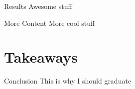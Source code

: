 \documentclass[%
  aspectratio=1610,
]{beamer}
\begin{document}
\begin{frame}{Results}
  \centering
  {\LARGE Awesome stuff}
\end{frame}

\begin{frame}{More Content}
  \centering
  {\LARGE More cool stuff}
\end{frame}


\section{Takeaways}



\begin{frame}{Conclusion}
  \centering
  {\LARGE This is why I should graduate}
\end{frame}
\end{document}
